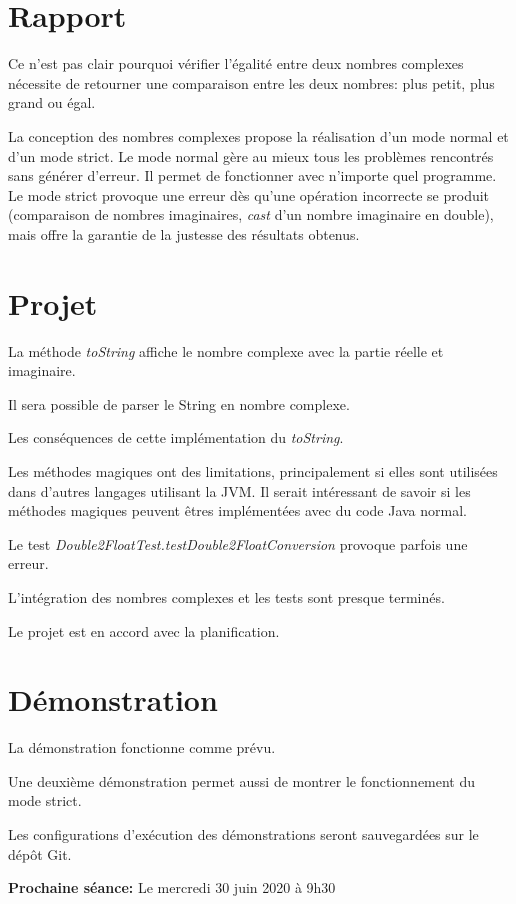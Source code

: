 \documentclass[11pt]{meetingmins}
\begin{document}
\section{Rapport}
\begin{hiddenitems}
    \item Ce n'est pas clair pourquoi vérifier l'égalité entre deux nombres complexes nécessite de retourner une comparaison entre les deux nombres: plus petit, plus grand ou égal.
    \item La conception des nombres complexes propose la réalisation d'un mode normal et d'un mode strict. Le mode normal gère au mieux tous les problèmes rencontrés sans générer d'erreur. Il permet de fonctionner avec n'importe quel programme. Le mode strict provoque une erreur dès qu'une opération incorrecte se produit (comparaison de nombres imaginaires, \textit{cast} d'un nombre imaginaire en double), mais offre la garantie de la justesse des résultats obtenus.
\end{hiddenitems}


\section{Projet}
\begin{hiddenitems}
    \item La méthode \textit{toString} affiche le nombre complexe avec la partie réelle et imaginaire.
    \item Il sera possible de parser le String en nombre complexe.
    \item Les conséquences de cette implémentation du \textit{toString}.
    \item Les méthodes magiques ont des limitations, principalement si elles sont utilisées dans d'autres langages utilisant la JVM. Il serait intéressant de savoir si les méthodes magiques peuvent êtres implémentées avec du code Java normal.
    \item Le test \textit{Double2FloatTest.testDouble2FloatConversion} provoque parfois une erreur.
    \item L'intégration des nombres complexes et les tests sont presque terminés.
    \item Le projet est en accord avec la planification.
\end{hiddenitems}


\section{Démonstration}
\begin{hiddenitems}
    \item La démonstration fonctionne comme prévu.
    \item Une deuxième démonstration permet aussi de montrer le fonctionnement du mode strict.
    \item Les configurations d'exécution des démonstrations seront sauvegardées sur le dépôt Git.
\end{hiddenitems}

\vspace{1em}
\par \noindent \textbf {Prochaine séance:} Le mercredi 30 juin 2020 à 9h30
\end{document}
